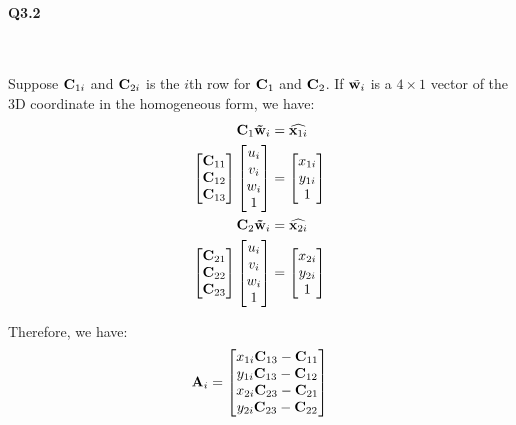 \documentclass[11pt]{article} \usepackage{fullpage} \usepackage{graphicx} \usepackage{epstopdf} \usepackage{color} \usepackage{psfrag} \usepackage{pdfsync}\usepackage{indentfirst}\usepackage{subfigure}\usepackage{float}\usepackage[section]{placeins}
\begin{document}
\paragraph{Q3.2}~{}

Suppose $\bold{C}_{1i}$ and $\bold{C}_{2i}$ is the $i$th row for $\bold{C}_1$ and $\bold{C}_2$. If $\tilde{\bold{w}_i}$ is a $4 \times 1$ vector of the 3D coordinate in the homogeneous form, we have:
\begin{align}
	\bold{C}_1\bold{\tilde{w}}_i & = \widehat{\bold{x}_{1i}} \\
	\begin{bmatrix} \bold{C}_{11} \\ \bold{C}_{12} \\ \bold{C}_{13} \end{bmatrix}\begin{bmatrix} u_{i} \\ v_{i} \\ w_{i} \\ 1 \end{bmatrix} & = \begin{bmatrix} x_{1i} \\ y_{1i} \\ 1 \end{bmatrix} \\
	\bold{C}_2\bold{\tilde{w}}_i & = \widehat{\bold{x}_{2i}} \\
	\begin{bmatrix} \bold{C}_{21} \\ \bold{C}_{22} \\ \bold{C}_{23} \end{bmatrix}\begin{bmatrix} u_{i} \\ v_{i} \\ w_{i} \\ 1 \end{bmatrix} & = \begin{bmatrix} x_{2i} \\ y_{2i} \\ 1 \end{bmatrix}
\end{align}

Therefore, we have:
\begin{equation}
	\bold{A}_i = \begin{bmatrix} x_{1i}\bold{C}_{13} - \bold{C}_{11} \\ y_{1i}\bold{C}_{13} - \bold{C}_{12} \\ x_{2i}\bold{C}_{23} - \bold{C}_{21} \\ y_{2i}\bold{C}_{23} - \bold{C}_{22} \end{bmatrix}
\end{equation}
\end{document}
